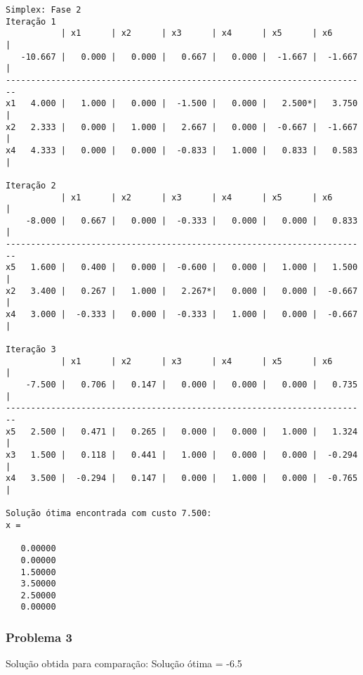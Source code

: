 \documentclass[brazil,times]{abnt}
\begin{document}
{\begin{verbatim}
Simplex: Fase 2
Iteração 1
           | x1      | x2      | x3      | x4      | x5      | x6      |
   -10.667 |   0.000 |   0.000 |   0.667 |   0.000 |  -1.667 |  -1.667 |
------------------------------------------------------------------------
x1   4.000 |   1.000 |   0.000 |  -1.500 |   0.000 |   2.500*|   3.750 |
x2   2.333 |   0.000 |   1.000 |   2.667 |   0.000 |  -0.667 |  -1.667 |
x4   4.333 |   0.000 |   0.000 |  -0.833 |   1.000 |   0.833 |   0.583 |

Iteração 2
           | x1      | x2      | x3      | x4      | x5      | x6      |
    -8.000 |   0.667 |   0.000 |  -0.333 |   0.000 |   0.000 |   0.833 |
------------------------------------------------------------------------
x5   1.600 |   0.400 |   0.000 |  -0.600 |   0.000 |   1.000 |   1.500 |
x2   3.400 |   0.267 |   1.000 |   2.267*|   0.000 |   0.000 |  -0.667 |
x4   3.000 |  -0.333 |   0.000 |  -0.333 |   1.000 |   0.000 |  -0.667 |

Iteração 3
           | x1      | x2      | x3      | x4      | x5      | x6      |
    -7.500 |   0.706 |   0.147 |   0.000 |   0.000 |   0.000 |   0.735 |
------------------------------------------------------------------------
x5   2.500 |   0.471 |   0.265 |   0.000 |   0.000 |   1.000 |   1.324 |
x3   1.500 |   0.118 |   0.441 |   1.000 |   0.000 |   0.000 |  -0.294 |
x4   3.500 |  -0.294 |   0.147 |   0.000 |   1.000 |   0.000 |  -0.765 |

Solução ótima encontrada com custo 7.500:
x =

   0.00000
   0.00000
   1.50000
   3.50000
   2.50000
   0.00000
\end{verbatim} }

\subsubsection*{Problema 3}
Solução obtida para comparação: Solução ótima = -6.5
\end{document}

